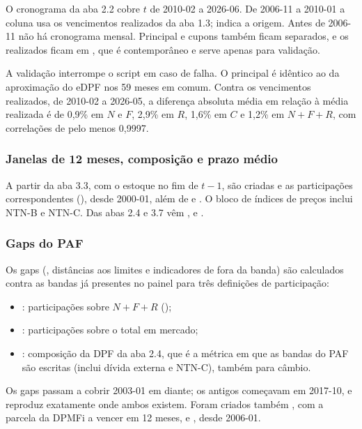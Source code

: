 \documentclass[12pt,a4paper]{article}
\begin{document}
O cronograma da aba 2.2 cobre \(t\) de 2010-02 a 2026-06. De 2006-11 a 2010-01 a
coluna usa os vencimentos realizados da aba 1.3;  indica a
origem. Antes de 2006-11 não há cronograma mensal. Principal e cupons também ficam
separados, e os realizados ficam em , que é
contemporâneo e serve apenas para validação.

A validação interrompe o script em caso de falha. O principal é idêntico ao da
aproximação do eDPF nos 59 meses em comum. Contra os vencimentos realizados, de
2010-02 a 2026-05, a diferença absoluta média em relação à média realizada é de
0,9\% em \(N\) e \(F\), 2,9\% em \(R\), 1,6\% em \(C\) e 1,2\% em \(N+F+R\), com
correlações de pelo menos 0,9997.

\subsubsection{Janelas de 12 meses, composição e prazo médio}

A partir da aba 3.3, com o estoque no fim de \(t-1\), são criadas
 e as participações correspondentes
(), desde 2000-01, além de  e
. O bloco de índices de preços
inclui NTN-B e NTN-C. Das abas 2.4 e 3.7 vêm
,  e
.

\subsubsection{Gaps do PAF}

Os gaps (, distâncias aos limites e indicadores de fora da banda) são
calculados contra as bandas já presentes no painel para três definições de
participação:
\begin{itemize}[leftmargin=1.2cm]
    \item {}: participações sobre \(N+F+R\) ();
    \item {}: participações sobre o total em mercado;
    \item {}: composição da DPF da aba 2.4, que é a métrica em que as bandas do
    PAF são escritas (inclui dívida externa e NTN-C), também para câmbio.
\end{itemize}
Os gaps passam a cobrir 2003-01 em diante; os antigos começavam em 2017-10, e
 reproduz exatamente  onde ambos
existem. Foram criados também , com a parcela da
DPMFi a vencer em 12 meses, e , desde 2006-01.
\end{document}
